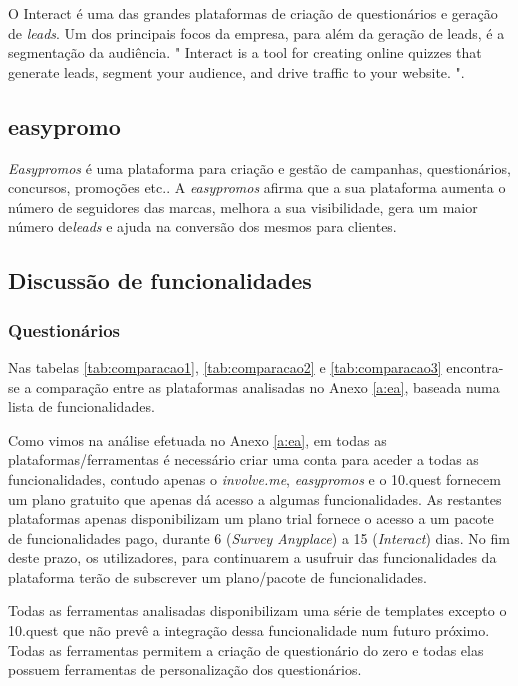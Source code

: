 O Interact é uma das grandes plataformas de criação de questionários e geração de \textit{leads}. Um dos principais focos da empresa, para além da geração de leads, é a segmentação da audiência. " Interact is a tool for creating online quizzes that generate leads, segment your audience, and drive traffic to your website. "\cite{interact}.



\subsection{easypromo}
\label{easypromoM}

\textit{Easypromos}\cite{f6} é uma plataforma para criação e gestão de campanhas, questionários, concursos, promoções etc.. A \textit{easypromos} afirma que a sua plataforma aumenta o número de seguidores das marcas, melhora a sua visibilidade, gera um maior número de\textit{leads} e ajuda na conversão dos mesmos para clientes.


\subsection{Discussão de funcionalidades}
\label{comparacao}

\subsubsection{Questionários}

Nas tabelas \ref{tab:comparacao1}, \ref{tab:comparacao2} e \ref{tab:comparacao3} encontra-se a comparação entre as plataformas analisadas no Anexo \ref{a:ea}, baseada numa lista de funcionalidades.

Como vimos na análise efetuada no Anexo \ref{a:ea}, em todas as plataformas/ferramentas é necessário criar uma conta para aceder a todas as funcionalidades, contudo apenas o \textit{involve.me}, \textit{easypromos} e o 10.quest fornecem um plano gratuito que apenas dá acesso a algumas funcionalidades. As restantes plataformas apenas disponibilizam um plano trial fornece o acesso a um pacote de funcionalidades pago, durante 6 (\textit{Survey Anyplace}) a 15 (\textit{Interact}) dias. No fim deste prazo, os utilizadores, para continuarem a usufruir das funcionalidades da plataforma terão de subscrever um plano/pacote de funcionalidades.

Todas as ferramentas analisadas disponibilizam uma série de templates excepto o 10.quest que não prevê a integração dessa funcionalidade num futuro próximo. Todas as ferramentas permitem a criação de questionário do zero e todas elas possuem ferramentas de personalização dos questionários.

